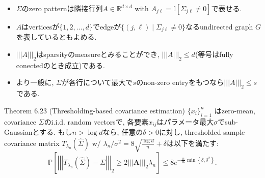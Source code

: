 \documentclass[unicode,aspectratio=169,11pt]{beamer}
\newcommand{\bb}{\mathbb}
\begin{document}
\begin{frame}{}{}
  \begin{itemize}
    \item $\Sigma$のzero patternは隣接行列$A \in \bb{R}^{d\times d}$ with $A_{j\ell} = \bb{I}[\Sigma_{j\ell} \ne 0]$で表せる.
    \item $A$はverticesが$\{1,2,\dots,d\}$でedgeが$\{(j, \ell)\mid \Sigma_{j\ell} \ne 0\}$なるundirected graph $G$ を表しているともよめる.
    \item $|||A|||_2$はsparsityのmeasureとみることができ, $|||A|||_2 \le d$(等号はfully conectedのとき成立)である.
    \item より一般に, $\Sigma$が各行について最大で$s$のnon-zero entryをもつなら$|||A|||_2 \le s$である.
  \end{itemize}
\end{frame}

\begin{frame}{}{}
  \begin{block}{Theorem 6.23 (Thresholding-based covariance estimation)}
    $\{x_i\}_{i=1}^n$ はzero-mean, covariance $\Sigma$のi.i.d. random vectorsで,
    各要素$x_{ij}$はパラメータ最大$\sigma$でsub-Gaussianとする.
    もし$n > \log d$なら, 任意の$\delta > 0$に対し, 
    thresholded sample covariance matrix $T_{\lambda_n}(\widehat{\Sigma})$ w/ $\lambda_n/\sigma^2 = 8 \sqrt{\frac{\log d}{n}} + \delta$は以下を満たす:
    \[
      \mathbb{P}\left[\left|\left|\left|T_{\lambda_{n}}(\widehat{\Sigma})- \Sigma\right|\right|\right|_{2} \geq 2|||\mathbf{A}|||_{2} \lambda_{n}\right]
      \leq 8 e^{-\frac{n}{16} \min \left\{\delta, \delta^{2}\right\}}.
      \tag{6.53}
    \]
  \end{block}
\end{frame}
\end{document}
